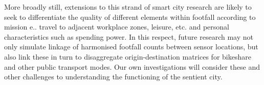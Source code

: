 More broadly still, extensions to this strand of smart city research are likely to seek to differentiate the quality of different elements within footfall according to mission e.. travel to adjacent workplace zones, leisure, etc. and personal characteristics such as spending power. In this respect, future research may not only simulate linkage of harmonised footfall counts between sensor locations, but also link these in turn to disaggregate origin-destination matrices for bikeshare and other public transport modes. Our own investigations will consider these and other challenges to understanding the functioning of the sentient city.
